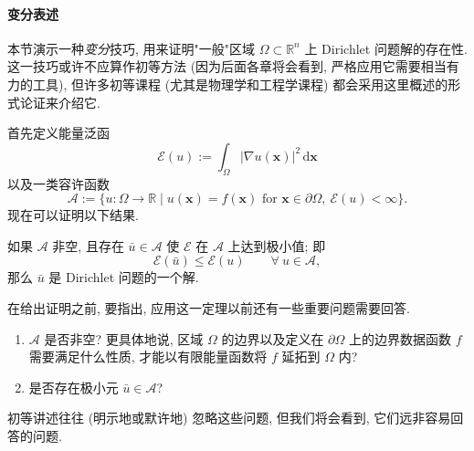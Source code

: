 \paragraph*{变分表述}

本节演示一种\emph{变分}技巧, 用来证明"一般"区域 $\Omega\subset\mathbb{R}^n$ 上 Dirichlet 问题解的存在性. 这一技巧或许不应算作初等方法 (因为后面各章将会看到, 严格应用它需要相当有力的工具), 但许多初等课程 (尤其是物理学和工程学课程) 都会采用这里概述的形式论证来介绍它.

首先定义能量泛函
\begin{equation}\label{eq:dirichlet-energy}
\mathcal{E}(u):=\int_\Omega|\nabla u(\bm{x})|^2\,\mathrm{d}\bm{x}
\end{equation}
以及一类容许函数
\begin{equation}\label{eq:dirichlet-admissible-class}
\mathcal{A}:=\{u:\Omega\to\mathbb{R}\mid u(\bm{x})=f(\bm{x})\text{ for }\bm{x}\in\partial\Omega,\ \mathcal{E}(u)<\infty\}.
\end{equation}
现在可以证明以下结果.

\begin{Theorem}
\label{thm:dirichlet-energy-minimizer}
如果 $\mathcal{A}$ 非空, 且存在 $\bar u\in\mathcal{A}$ 使 $\mathcal{E}$ 在 $\mathcal{A}$ 上达到极小值; 即
\begin{equation}\label{eq:dirichlet-energy-minimizer}
\mathcal{E}(\bar u)\leq\mathcal{E}(u)\qquad\forall\ u\in\mathcal{A},
\end{equation}
那么 $\bar u$ 是 Dirichlet 问题的一个解.
\end{Theorem}

在给出证明之前, 要指出, 应用这一定理以前还有一些重要问题需要回答.
\begin{enumerate}
\item $\mathcal{A}$ 是否非空? 更具体地说, 区域 $\Omega$ 的边界以及定义在 $\partial\Omega$ 上的边界数据函数 $f$ 需要满足什么性质, 才能以有限能量函数将 $f$ 延拓到 $\Omega$ 内?
\item 是否存在极小元 $\bar u\in\mathcal{A}$?
\end{enumerate}
初等讲述往往 (明示地或默许地) 忽略这些问题, 但我们将会看到, 它们远非容易回答的问题.

